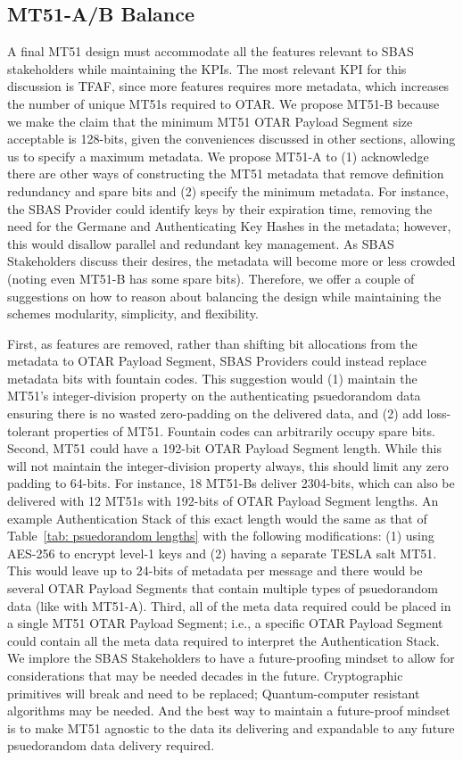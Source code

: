 \documentclass[letterpaper,times]{IONconf/IONconf}
\begin{document}
	\subsection{MT51-A/B Balance} \label{sec: MT51 balance}

		A final MT51 design must accommodate all the features relevant to SBAS stakeholders while maintaining the KPIs.
		The most relevant KPI for this discussion is TFAF, since more features requires more metadata, which increases the number of unique MT51s required to OTAR.
		We propose MT51-B because we make the claim that the minimum MT51 OTAR Payload Segment size acceptable is 128-bits, given the conveniences discussed in other sections, allowing us to specify a maximum metadata.
		We propose MT51-A to (1) acknowledge there are other ways of constructing the MT51 metadata that remove definition redundancy and spare bits and (2) specify the minimum metadata.
		For instance, the SBAS Provider could identify keys by their expiration time, removing the need for the Germane and Authenticating Key Hashes in the metadata; however, this would disallow parallel and redundant key management.
		As SBAS Stakeholders discuss their desires, the metadata will become more or less crowded (noting even MT51-B has some spare bits).
		Therefore, we offer a couple of suggestions on how to reason about balancing the design while maintaining the schemes modularity, simplicity, and flexibility.

		First, as features are removed, rather than shifting bit allocations from the metadata to OTAR Payload Segment, SBAS Providers could instead replace metadata bits with fountain codes.
		This suggestion would (1) maintain the MT51's integer-division property on the authenticating psuedorandom data ensuring there is no wasted zero-padding on the delivered data, and (2) add loss-tolerant properties of MT51.
		Fountain codes can arbitrarily occupy spare bits.
		Second, MT51 could have a 192-bit OTAR Payload Segment length.
		While this will not maintain the integer-division property always, this should limit any zero padding to 64-bits.
		For instance, 18 MT51-Bs deliver 2304-bits, which can also be delivered with 12 MT51s with 192-bits of OTAR Payload Segment lengths.
		An example Authentication Stack of this exact length would the same as that of Table~\ref{tab: psuedorandom lengths} with the following modifications: (1) using AES-256 to encrypt level-1 keys and (2) having a separate TESLA salt MT51.
		This would leave up to 24-bits of metadata per message and there would be several OTAR Payload Segments that contain multiple types of psuedorandom data (like with MT51-A). 
		Third, all of the meta data required could be placed in a single MT51 OTAR Payload Segment; i.e., a specific OTAR Payload Segment could contain all the meta data required to interpret the Authentication Stack.
		We implore the SBAS Stakeholders to have a future-proofing mindset to allow for considerations that may be needed decades in the future.
		Cryptographic primitives will break and need to be replaced; Quantum-computer resistant algorithms may be needed.
		And the best way to maintain a future-proof mindset is to make MT51 agnostic to the data its delivering and expandable to any future psuedorandom data delivery required.
\end{document}
